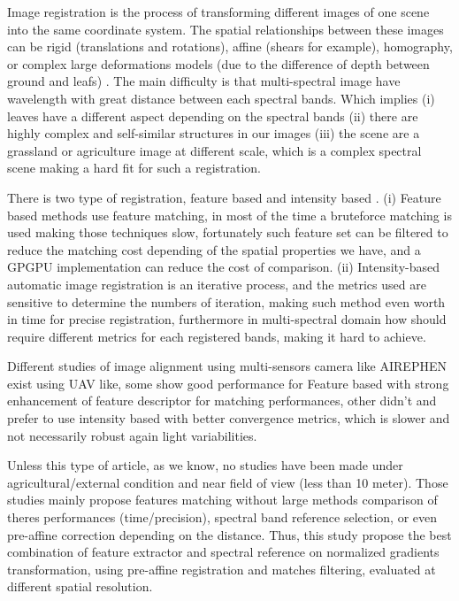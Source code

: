 \documentclass[]{elsarticle}
\begin{document}
		Image registration is the process of transforming different images of one scene into the same coordinate system.
		The spatial relationships between these images can be rigid (translations and rotations), affine (shears for example),
		homography, or complex large deformations models (due to the difference of depth between ground and leafs) \cite{Kamoun}.
		The main difficulty is that multi-spectral image have wavelength with great distance between each spectral bands.
		Which implies (i) leaves have a different aspect depending on the spectral bands
		(ii) there are highly complex and self-similar structures in our images
		(iii) the scene are a grassland or agriculture image at different scale, which is a complex spectral scene making a hard fit for such a registration.
		\\
		\par There is two type of registration, feature based and intensity based \cite{Zitova}.
		(i) Feature based methods use feature matching, in most of the time a bruteforce matching is used making those techniques slow,
		fortunately such feature set can be filtered to reduce the matching cost depending of the spatial properties we have, and a GPGPU implementation can reduce the cost of comparison.
		(ii) Intensity-based automatic image registration is an iterative process, and the metrics used are sensitive to determine the numbers of iteration,
		making such method even worth in time for precise registration, furthermore in multi-spectral domain how should require different metrics for each registered bands,
		making it hard to achieve.
		\\
		\par Different studies of image alignment using multi-sensors camera like AIREPHEN exist using UAV like,
		some show good performance for Feature based \cite{DantasDiasJunior, Vakalopoulou} with strong enhancement of feature descriptor for matching performances,
		other didn't and prefer to use intensity based \cite{douarre:hal-02183837} with better convergence metrics, which is slower and not necessarily robust again light variabilities.
		\\
		\par Unless this type of article, as we know, no studies have been made under agricultural/external condition and near field of view (less than 10 meter).
		Those studies mainly propose features matching without large methods comparison of theres performances (time/precision),
		spectral band reference selection, or even pre-affine correction depending on the distance.
		Thus, this study propose the best combination of feature extractor and spectral reference on normalized gradients transformation,
		using pre-affine registration and matches filtering, evaluated at different spatial resolution.
		
\end{document}
